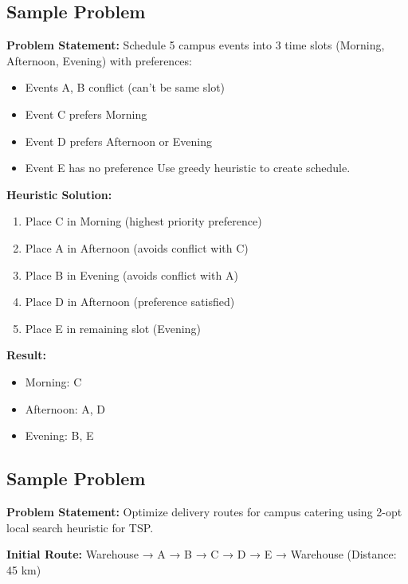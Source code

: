 \documentclass[
  letterpaper,
  DIV=11,
  numbers=noendperiod]{scrreprt}
\providecommand{\tightlist}{%
  \setlength{\itemsep}{0pt}\setlength{\parskip}{0pt}}
\begin{document}
\subsection{Sample Problem}\label{sample-problem-12}

\textbf{Problem Statement:} Schedule 5 campus events into 3 time slots
(Morning, Afternoon, Evening) with preferences:

\begin{itemize}
\tightlist
\item
  Events A, B conflict (can't be same slot)
\item
  Event C prefers Morning
\item
  Event D prefers Afternoon or Evening
\item
  Event E has no preference Use greedy heuristic to create schedule.
\end{itemize}

\textbf{Heuristic Solution:}

\begin{enumerate}
\def\labelenumi{\arabic{enumi}.}
\tightlist
\item
  Place C in Morning (highest priority preference)
\item
  Place A in Afternoon (avoids conflict with C)
\item
  Place B in Evening (avoids conflict with A)
\item
  Place D in Afternoon (preference satisfied)
\item
  Place E in remaining slot (Evening)
\end{enumerate}

\textbf{Result:}

\begin{itemize}
\tightlist
\item
  Morning: C
\item
  Afternoon: A, D
\item
  Evening: B, E
\end{itemize}

\subsection{Sample Problem}\label{sample-problem-13}

\textbf{Problem Statement:} Optimize delivery routes for campus catering
using 2-opt local search heuristic for TSP.

\textbf{Initial Route:} Warehouse → A → B → C → D → E → Warehouse
(Distance: 45 km)
\end{document}
